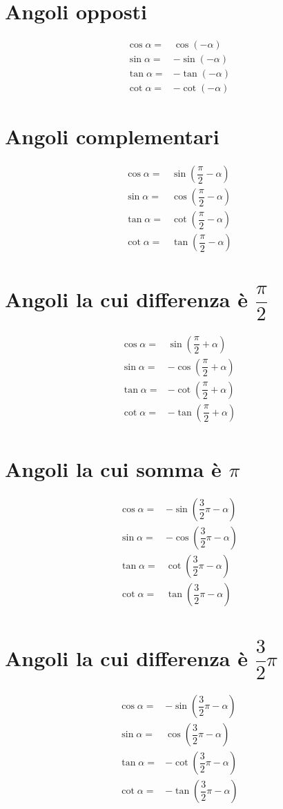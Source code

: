 \section{Angoli opposti}
\begin{align*}
\cos\alpha=&\cos(-\alpha)\\
\sin\alpha=&-\sin(-\alpha)\\
\tan\alpha=&-\tan(-\alpha)\\
\cot\alpha=&-\cot(-\alpha)
\end{align*}
\section{Angoli complementari}
\begin{align*}
\cos\alpha=&\sin(\dfrac{\pi}{2}-\alpha)\\
\sin\alpha=&\cos(\dfrac{\pi}{2}-\alpha)\\
\tan\alpha=&\cot(\dfrac{\pi}{2}-\alpha)\\
\cot\alpha=&\tan(\dfrac{\pi}{2}-\alpha)\\
\end{align*}
\section{Angoli la cui differenza è \texorpdfstring{$\dfrac{\pi}{2}$}{\textpi/2} }
\begin{align*}
\cos\alpha=&\sin(\dfrac{\pi}{2}+\alpha)\\
\sin\alpha=&-\cos(\dfrac{\pi}{2}+\alpha)\\
\tan\alpha=&-\cot(\dfrac{\pi}{2}+\alpha)\\
\cot\alpha=&-\tan(\dfrac{\pi}{2}+\alpha)\\
\end{align*}
\section{Angoli la cui somma è \texorpdfstring{$\pi$}{\textpi}}
\begin{align*}
\cos\alpha=&-\sin(\dfrac{3}{2}\pi-\alpha)\\
\sin\alpha=&-\cos(\dfrac{3}{2}\pi-\alpha)\\
\tan\alpha=&\cot(\dfrac{3}{2}\pi-\alpha)\\
\cot\alpha=&\tan(\dfrac{3}{2}\pi-\alpha)\\
\end{align*}
\section{Angoli la cui differenza è \texorpdfstring{$\dfrac{3}{2}\pi$}{3/2 \textpi}}
\begin{align*} 
\cos\alpha=&-\sin(\dfrac{3}{2}\pi-\alpha)\\
\sin\alpha=&\cos(\dfrac{3}{2}\pi-\alpha)\\
\tan\alpha=&-\cot(\dfrac{3}{2}\pi-\alpha)\\
\cot\alpha=&-\tan(\dfrac{3}{2}\pi-\alpha)\\
\end{align*}
